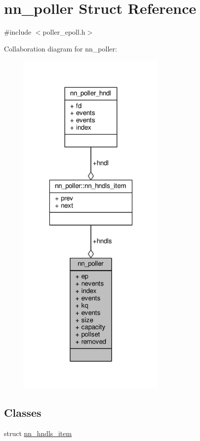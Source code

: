 \hypertarget{structnn__poller}{}\section{nn\+\_\+poller Struct Reference}
\label{structnn__poller}


{\ttfamily \#include $<$poller\+\_\+epoll.\+h$>$}



Collaboration diagram for nn\+\_\+poller\+:\nopagebreak
\begin{figure}[H]
\begin{center}
\leavevmode
\includegraphics[width=204pt]{structnn__poller__coll__graph}
\end{center}
\end{figure}
\subsection*{Classes}
\begin{DoxyCompactItemize}
\item 
struct \hyperlink{structnn__poller_1_1nn__hndls__item}{nn\+\_\+hndls\+\_\+item}
\end{DoxyCompactItemize}
